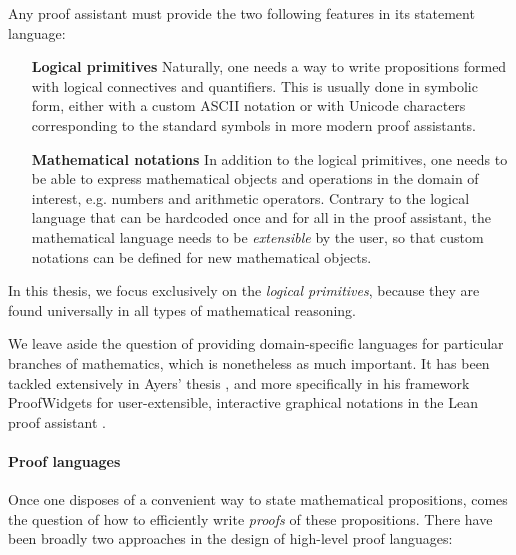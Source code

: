 Any proof assistant must provide the two following features in its statement
language:

\begin{itemize}
  \item[\textbf{Logical primitives}] Naturally, one needs a way to write
  propositions formed with logical connectives and quantifiers. This is usually
  done in symbolic form, either with a custom ASCII notation or with Unicode
  characters corresponding to the standard symbols in more modern proof
  assistants. 
  \item[\textbf{Mathematical notations}] In addition to the logical primitives,
  one needs to be able to express mathematical objects and operations in the
  domain of interest, e.g. numbers and arithmetic operators. Contrary to the
  logical language that can be hardcoded once and for all in the proof
  assistant, the mathematical language needs to be \emph{extensible} by the
  user, so that custom notations can be defined for new mathematical objects.
\end{itemize}

\begin{emphpar}
  In this thesis, we focus exclusively on the \emph{logical primitives}, because
  they are found universally in all types of mathematical reasoning. 
\end{emphpar}

We leave aside the question of providing domain-specific languages for
particular branches of mathematics, which is nonetheless as much important. It
has been tackled extensively in Ayers' thesis , and more
specifically in his framework ProofWidgets for user-extensible, interactive
graphical notations in the Lean proof assistant .

\paragraph{Proof languages}

Once one disposes of a convenient way to state mathematical propositions, comes
the question of how to efficiently write \emph{proofs} of these propositions.
There have been broadly two approaches in the design of high-level proof
languages:

